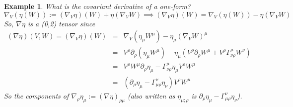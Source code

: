 \documentclass[a4paper]{article}
\newtheorem{eg}{Example}[section]
\theoremstyle{new}
\begin{document}
\begin{eg}
What is the covariant derivative of a one-form?
$$\nabla_V(\eta(W)):=(\nabla_V\eta)(W)+\eta(\nabla_VW)\implies (\nabla_V\eta)(W)=\nabla_V(\eta(W))-\eta(\nabla_VW)$$
So, $\nabla\eta$ is a (0,2) tensor since
\begin{eqnarray}
(\nabla\eta)(V,W)=(\nabla_V\eta)(W)&=&\nabla_V(\eta_\mu W^\mu)-\eta_\mu(\nabla_VW)^\mu\nonumber\\&=&V^\rho\partial_\rho(\eta_\mu W^\mu)-\eta_\mu(V^\rho\partial_\rho W^\mu+V^\rho\Gamma_{\nu\rho}^\mu W^\nu)\nonumber\\&=&V^\rho W^\mu\partial_\rho\eta_\mu-\Gamma_{\nu\rho}^\mu\eta_\mu V^\rho W^\mu\nonumber\\&=&(\partial_\rho\eta_\mu-\Gamma_{\mu\rho}^\nu\eta_\nu)V^\rho W^\mu\nonumber
\end{eqnarray}
So the components of $\nabla_\rho\eta_\mu:=(\nabla\eta)_{\rho\mu}$ (also written as $\eta_{\mu;\rho}$ is $\partial_\rho\eta_\mu-\Gamma_{\mu\rho}^\nu\eta_\nu$).
\end{eg}
\newpage
\end{document}
